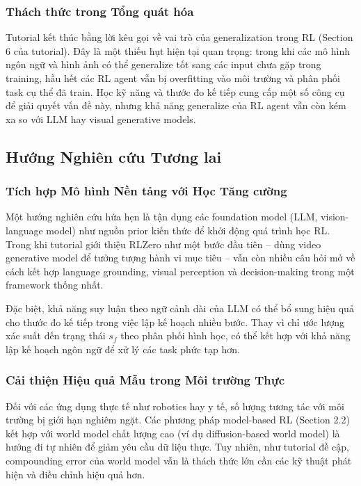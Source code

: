 \subsubsection{Thách thức trong Tổng quát hóa}

Tutorial kết thúc bằng lời kêu gọi về vai trò của generalization trong RL (Section 6 của tutorial).
Đây là một thiếu hụt hiện tại quan trọng: trong khi các mô hình ngôn ngữ và hình ảnh có thể
generalize tốt sang các input chưa gặp trong training, hầu hết các RL agent vẫn bị
overfitting vào môi trường và phân phối task cụ thể đã train.
Học kỹ năng và thước đo kế tiếp cung cấp một số công cụ để giải quyết vấn đề này,
nhưng khả năng generalize của RL agent vẫn còn kém xa so với LLM hay visual generative models.

\subsection{Hướng Nghiên cứu Tương lai}

\subsubsection{Tích hợp Mô hình Nền tảng với Học Tăng cường}

Một hướng nghiên cứu hứa hẹn là tận dụng các foundation model (LLM, vision-language model)
như nguồn prior kiến thức để khởi động quá trình học RL.
Trong khi tutorial giới thiệu RLZero như một bước đầu tiên -- dùng video generative model để
tưởng tượng hành vi mục tiêu -- vẫn còn nhiều câu hỏi mở về cách kết hợp
language grounding, visual perception và decision-making trong một framework thống nhất.

Đặc biệt, khả năng suy luận theo ngữ cảnh dài của LLM có thể bổ sung hiệu quả cho thước đo kế tiếp
trong việc lập kế hoạch nhiều bước.
Thay vì chỉ ước lượng xác suất đến trạng thái $s_f$ theo phân phối hình học,
có thể kết hợp với khả năng lập kế hoạch ngôn ngữ để xử lý các task phức tạp hơn.

\subsubsection{Cải thiện Hiệu quả Mẫu trong Môi trường Thực}

Đối với các ứng dụng thực tế như robotics hay y tế, số lượng tương tác với môi trường bị giới hạn
nghiêm ngặt.
Các phương pháp model-based RL (Section 2.2) kết hợp với world model chất lượng cao (ví dụ diffusion-based
world model) là hướng đi tự nhiên để giảm yêu cầu dữ liệu thực.
Tuy nhiên, như tutorial đề cập, compounding error của world model vẫn là thách thức lớn cần
các kỹ thuật phát hiện và điều chỉnh hiệu quả hơn.

